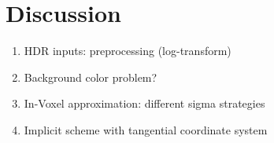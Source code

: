 


\section{Discussion}

\begin{enumerate}
    \item HDR inputs: preprocessing (log-transform)
    \item Background color problem?
    \item In-Voxel approximation: different sigma strategies
    \item Implicit scheme with tangential coordinate system
\end{enumerate}




















